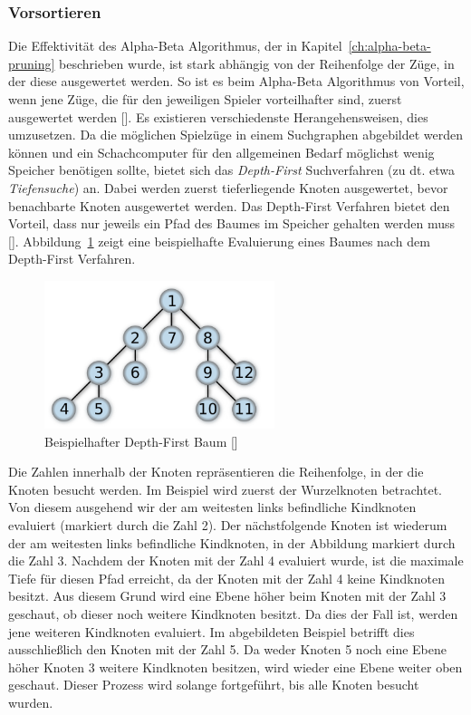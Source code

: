 \subsubsection{Vorsortieren}

Die Effektivität des Alpha-Beta Algorithmus, der in Kapitel~\ref{ch:alpha-beta-pruning} beschrieben wurde, ist stark abhängig von der Reihenfolge der Züge, in der diese ausgewertet werden.
So ist es beim Alpha-Beta Algorithmus von Vorteil, wenn jene Züge, die für den jeweiligen Spieler vorteilhafter sind, zuerst ausgewertet werden [\cite{Russell2010}].
Es existieren verschiedenste Herangehensweisen, dies umzusetzen.
Da die möglichen Spielzüge in einem Suchgraphen abgebildet werden können und ein Schachcomputer für den allgemeinen Bedarf möglichst wenig Speicher benötigen sollte, bietet sich das \textit{Depth-First} Suchverfahren (zu dt. etwa \textit{Tiefensuche}) an.
Dabei werden zuerst tieferliegende Knoten ausgewertet, bevor benachbarte Knoten ausgewertet werden.
Das Depth-First Verfahren bietet den Vorteil, dass nur jeweils ein Pfad des Baumes im Speicher gehalten werden muss [\cite{Wiki2019b}].
Abbildung~\ref{fig:pre-sorting_depth-first-tree} zeigt eine beispielhafte Evaluierung eines Baumes nach dem Depth-First Verfahren.

\begin{figure}[H]
    \centering
    \includegraphics[width=0.6\textwidth]{images/theory/pre-sorting_depth-first-tree.png}
    \caption[Beispielhafter Depth-First Baum]{Beispielhafter Depth-First Baum [\cite{Wiki2019b}]}
    \label{fig:pre-sorting_depth-first-tree}
\end{figure}

\noindent Die Zahlen innerhalb der Knoten repräsentieren die Reihenfolge, in der die Knoten besucht werden.
Im Beispiel wird zuerst der Wurzelknoten betrachtet.
Von diesem ausgehend wir der am weitesten links befindliche Kindknoten evaluiert (markiert durch die Zahl 2).
Der nächstfolgende Knoten ist wiederum der am weitesten links befindliche Kindknoten, in der Abbildung markiert durch die Zahl 3.
Nachdem der Knoten mit der Zahl 4 evaluiert wurde, ist die maximale Tiefe für diesen Pfad erreicht, da der Knoten mit der Zahl 4 keine Kindknoten besitzt.
Aus diesem Grund wird eine Ebene höher beim Knoten mit der Zahl 3 geschaut, ob dieser noch weitere Kindknoten besitzt.
Da dies der Fall ist, werden jene weiteren Kindknoten evaluiert.
Im abgebildeten Beispiel betrifft dies ausschließlich den Knoten mit der Zahl 5.
Da weder Knoten 5 noch eine Ebene höher Knoten 3 weitere Kindknoten besitzen, wird wieder eine Ebene weiter oben geschaut.
Dieser Prozess wird solange fortgeführt, bis alle Knoten besucht wurden.

